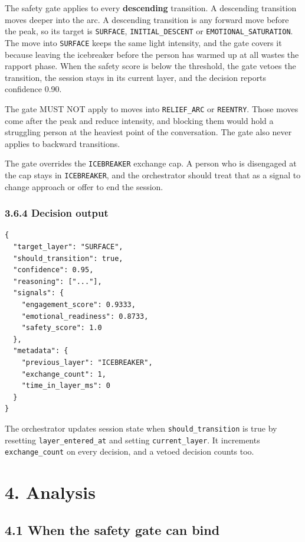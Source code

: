 \documentclass[11pt]{article}
\begin{document}
The safety gate applies to every \textbf{descending} transition. A
descending transition moves deeper into the arc. A descending transition
is any forward move before the peak, so its target is \texttt{SURFACE},
\texttt{INITIAL\_\allowbreak{}DESCENT} or \texttt{EMOTIONAL\_\allowbreak{}SATURATION}. The move
into \texttt{SURFACE} keeps the same light intensity, and the gate
covers it because leaving the icebreaker before the person has warmed up
at all wastes the rapport phase. When the safety score is below the
threshold, the gate vetoes the transition, the session stays in its
current layer, and the decision reports confidence 0.90.

The gate MUST NOT apply to moves into \texttt{RELIEF\_\allowbreak{}ARC} or
\texttt{REENTRY}. Those moves come after the peak and reduce intensity,
and blocking them would hold a struggling person at the heaviest point
of the conversation. The gate also never applies to backward
transitions.

The gate overrides the \texttt{ICEBREAKER} exchange cap. A person who is
disengaged at the cap stays in \texttt{ICEBREAKER}, and the orchestrator
should treat that as a signal to change approach or offer to end the
session.

\subsubsection{3.6.4 Decision output}

\begin{verbatim}
{
  "target_layer": "SURFACE",
  "should_transition": true,
  "confidence": 0.95,
  "reasoning": ["..."],
  "signals": {
    "engagement_score": 0.9333,
    "emotional_readiness": 0.8733,
    "safety_score": 1.0
  },
  "metadata": {
    "previous_layer": "ICEBREAKER",
    "exchange_count": 1,
    "time_in_layer_ms": 0
  }
}
\end{verbatim}

The orchestrator updates session state when \texttt{should\_\allowbreak{}transition}
is true by resetting \texttt{layer\_\allowbreak{}entered\_\allowbreak{}at} and setting
\texttt{current\_\allowbreak{}layer}. It increments \texttt{exchange\_\allowbreak{}count} on every
decision, and a vetoed decision counts too.

\section{4. Analysis}

\subsection{4.1 When the safety gate can bind}
\end{document}
